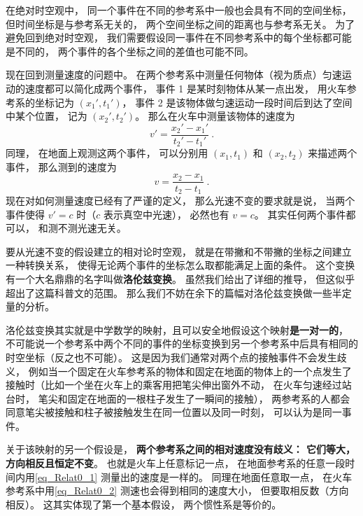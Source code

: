 在绝对时空观中， 同一个事件在不同的参考系中一般也会具有不同的空间坐标， 但时间坐标是与参考系无关的， 两个空间坐标之间的距离也与参考系无关。 为了避免回到绝对时空观， 我们需要假设同一事件在不同参考系中的每个坐标都可能是不同的， 两个事件的各个坐标之间的差值也可能不同。

现在回到测量速度的问题中。 在两个参考系中测量任何物体（视为质点）匀速运动的速度都可以简化成两个事件， 事件 1 是某时刻物体从某一点出发， 用火车参考系的坐标记为 $(x_1', t_1')$， 事件 2 是该物体做匀速运动一段时间后到达了空间中某个位置， 记为 $(x_2', t_2')$。 那么在火车中测量该物体的速度为
\begin{equation}\label{eq_Relat0_2}
v' = \frac{x_2' - x_1'}{t_2' - t_1'}~.
\end{equation}
同理， 在地面上观测这两个事件， 可以分别用 $(x_1, t_1)$ 和 $(x_2, t_2)$ 来描述两个事件， 那么测到的速度为
\begin{equation}\label{eq_Relat0_1}
v = \frac{x_2 - x_1}{t_2 - t_1}~.
\end{equation}
现在对如何测量速度已经有了严谨的定义， 那么光速不变的要求就是说， 当两个事件使得 $v' = c$ 时（$c$ 表示真空中光速）， 必然也有 $v = c$。 其实任何两个事件都可以， 和测不测光速无关。

要从光速不变的假设建立的相对论时空观， 就是在带撇和不带撇的坐标之间建立一种转换关系， 使得无论两个事件的坐标怎么取都能满足上面的条件。 这个变换有一个大名鼎鼎的名字叫做\textbf{洛伦兹变换}。 虽然我们给出了详细的推导， 但这似乎超出了这篇科普文的范围。 那么我们不妨在余下的篇幅对洛伦兹变换做一些半定量的分析。

洛伦兹变换其实就是中学数学的映射，且可以安全地假设这个映射\textbf{是一对一的}， 不可能说一个参考系中两个不同的事件的坐标变换到另一个参考系中后具有相同的时空坐标（反之也不可能）。 这是因为我们通常对两个点的接触事件不会发生歧义， 例如当一个固定在火车参考系的物体和固定在地面的物体上的一个点发生了接触时（比如一个坐在火车上的乘客用把笔尖伸出窗外不动， 在火车匀速经过站台时， 笔尖和固定在地面的一根柱子发生了一瞬间的接触）， 两参考系的人都会同意笔尖被接触和柱子被接触发生在同一位置以及同一时刻， 可以认为是同一事件。

关于该映射的另一个假设是， \textbf{两个参考系之间的相对速度没有歧义： 它们等大， 方向相反且恒定不变}。 也就是火车上任意标记一点， 在地面参考系的任意一段时间内用\autoref{eq_Relat0_1} 测量出的速度是一样的。 同理在地面任意取一点， 在火车参考系中用\autoref{eq_Relat0_2} 测速也会得到相同的速度大小， 但要取相反数（方向相反）。 这其实体现了第一个基本假设， 两个惯性系是等价的。

